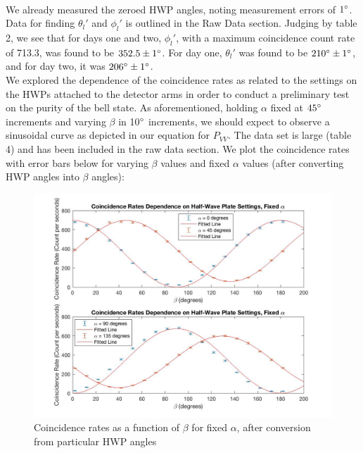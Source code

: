 \documentclass{article}
\begin{document}
    \\\indent We already measured the zeroed HWP angles, noting measurement errors of $1\degree$. Data for finding $\theta_l'$ and $\phi_l'$ is outlined in the Raw Data section. Judging by table 2, we see that for days one and two, $\phi_l'$, with a maximum coincidence count rate of 713.3, was found to be $352.5\pm 1\degree$. For day one, $\theta_l'$ was found to be $210\degree\pm 1\degree$, and for day two, it was $206\degree \pm 1\degree$. 
    \\\indent We explored the dependence of the coincidence rates as related to the settings on the HWPs attached to the detector arms in order to conduct a preliminary test on the purity of the bell state. As aforementioned, holding $\alpha$ fixed at $45\degree$ increments and varying $\beta$ in 10$\degree$ increments, we should expect to observe a sinusoidal curve as depicted in our equation for $P_{VV}$. The data set is large (table 4) and has been included in the raw data section. We plot the coincidence rates with error bars below for varying $\beta$ values and fixed $\alpha$ values (after converting HWP angles into $\beta$ angles):
 \begin{figure}[H] %
    \centering
    \includegraphics[scale = 0.3]{2.jpg}
    \caption{Coincidence rates as a function of $\beta$ for fixed $\alpha$, after conversion from particular HWP angles}
    \label{fig:my_label}
\end{figure}
\end{document}
